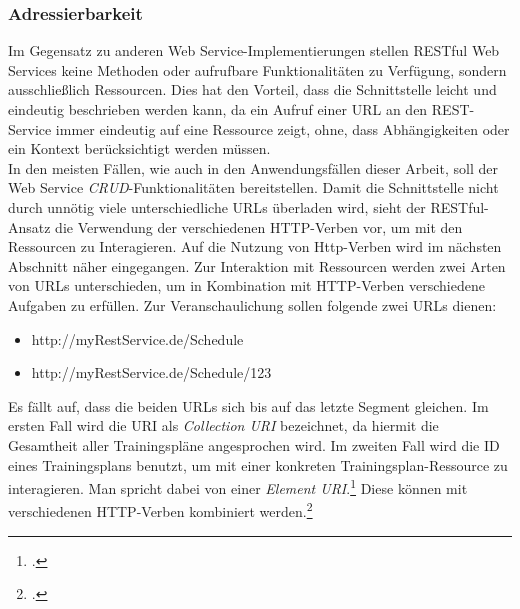 \subsubsection*{Adressierbarkeit}
Im Gegensatz zu anderen Web Service-Implementierungen stellen \ac{REST}ful Web Services keine Methoden oder aufrufbare Funktionalitäten zu Verfügung, sondern ausschließlich Ressourcen. Dies hat den Vorteil, dass die Schnittstelle leicht und eindeutig beschrieben werden kann, da ein Aufruf einer \ac{URL} an den \ac{REST}-Service immer eindeutig auf eine Ressource zeigt, ohne, dass Abhängigkeiten oder ein Kontext berücksichtigt werden müssen. \\
In den meisten Fällen, wie auch in den Anwendungsfällen dieser Arbeit, soll der Web Service \textit{\ac{CRUD}}-Funktionalitäten bereitstellen. Damit die Schnittstelle nicht durch unnötig viele unterschiedliche \ac{URL}s überladen wird, sieht der \ac{REST}ful-Ansatz die Verwendung der verschiedenen \ac{HTTP}-Verben vor, um mit den Ressourcen zu Interagieren. Auf die Nutzung von Http-Verben wird im nächsten Abschnitt näher eingegangen. Zur Interaktion mit Ressourcen werden zwei Arten von \ac{URL}s unterschieden, um in Kombination mit \ac{HTTP}-Verben verschiedene Aufgaben zu erfüllen. Zur Veranschaulichung sollen folgende zwei \ac{URL}s dienen:
\begin{itemize}
\item http://myRestService.de/Schedule
\item http://myRestService.de/Schedule/123
\end{itemize}
Es fällt auf, dass die beiden \ac{URL}s sich bis auf das letzte Segment gleichen. Im ersten Fall wird die \ac{URI} als \textit{Collection \ac{URI}} bezeichnet, da hiermit die Gesamtheit aller Trainingspläne angesprochen wird. Im zweiten Fall wird die ID eines Trainingsplans benutzt, um mit einer konkreten Trainingsplan-Ressource zu interagieren. Man spricht dabei von einer \textit{Element \ac{URI}}.\footcite[S. 12ff.]{Building-a-REST-Service} Diese können mit verschiedenen \ac{HTTP}-Verben kombiniert werden.\footcite[S. 26ff.]{REST-und-HTTP}
